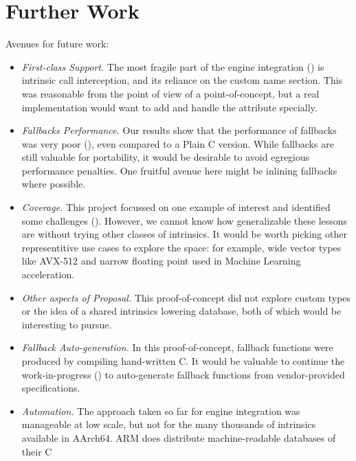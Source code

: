 \section{Further Work}
\label{sec:future}

Avenues for future work:

\begin{itemize}
    \item \emph{First-class  Support.}
        The most fragile part of the engine integration () is
        intrinsic call interception, and its reliance on the custom name
        section. This was reasonable from the point of view of a
        point-of-concept, but a real implementation would want to add and handle
        the  attribute specially.
    \item \emph{Fallbacks Performance.}
        Our results show that the performance of \wasm fallbacks was very poor
        (), even compared to a Plain C version.  While fallbacks
        are still valuable for portability, it would be desirable to avoid
        egregious performance penalties.  One fruitful avenue here might be
        inlining fallbacks where possible.
    \item \emph{Coverage.}
        This project focussed on one example of interest and identified some
        challenges (). However, we cannot know how
        generalizable these lessons are without trying other classes of
        intrinsics. It would be worth picking other representitive use cases to
        explore the space: for example, wide vector types like AVX-512 and
        narrow floating point used in Machine Learning acceleration.
    \item \emph{Other aspects of  Proposal.}
        This proof-of-concept did not explore custom types or the idea of a
        shared intrinsics lowering database, both of which would be interesting
        to pursue.
    \item \emph{Fallback Auto-generation.}
        In this proof-of-concept, fallback functions were produced by compiling
        hand-written C.  It would be valuable to continue the work-in-progress
        () to auto-generate fallback functions from vendor-provided
        specifications.
    \item \emph{Automation.}
        The approach taken so far for engine integration was manageable at low
        scale, but not for the many thousands of intrinsics available in
        AArch64. ARM does distribute machine-readable databases of their C

\end{itemize}
